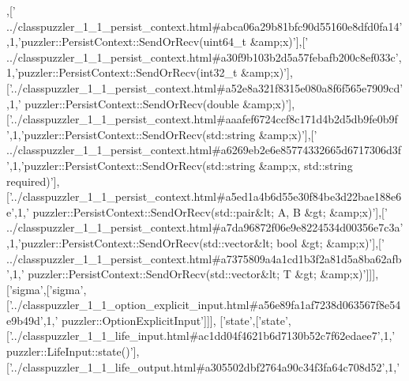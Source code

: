 \begin{DoxyCode}
  [\textcolor{stringliteral}{'sendorrecv'},[\textcolor{stringliteral}{'SendOrRecv'},[\textcolor{stringliteral}{'../classpuzzler\_1\_1\_persist\_context.html#a6dff69ce0bd12a3facf21e283148a43c'}
      ,1,\textcolor{stringliteral}{'puzzler::PersistContext::SendOrRecv(uint32\_t &amp;x)'}],[\textcolor{stringliteral}{'
      ../classpuzzler\_1\_1\_persist\_context.html#abca06a29b81bfc90d55160e8dfd0fa14'},1,\textcolor{stringliteral}{'puzzler::PersistContext::SendOrRecv(uint64\_t &amp;x)'}],[\textcolor{stringliteral}{'
      ../classpuzzler\_1\_1\_persist\_context.html#a30f9b103b2d5a57febafb200c8ef033c'},1,\textcolor{stringliteral}{'puzzler::PersistContext::SendOrRecv(int32\_t
       &amp;x)'}],[\textcolor{stringliteral}{'../classpuzzler\_1\_1\_persist\_context.html#a52e8a321f8315e080a8f6f565e7909cd'},1,\textcolor{stringliteral}{'
      puzzler::PersistContext::SendOrRecv(double &amp;x)'}],[\textcolor{stringliteral}{'../classpuzzler\_1\_1\_persist\_context.html#aaafef6724ccf8c171d4b2d5db9fe0b9f
      '},1,\textcolor{stringliteral}{'puzzler::PersistContext::SendOrRecv(std::string &amp;x)'}],[\textcolor{stringliteral}{'
      ../classpuzzler\_1\_1\_persist\_context.html#a6269eb2e6e85774332665d6717306d3f'},1,\textcolor{stringliteral}{'puzzler::PersistContext::SendOrRecv(std::string &amp;x, std::string
       required)'}],[\textcolor{stringliteral}{'../classpuzzler\_1\_1\_persist\_context.html#a5ed1a4b6d55e30f84be3d22bae188e6e'},1,\textcolor{stringliteral}{'
      puzzler::PersistContext::SendOrRecv(std::pair&lt; A, B &gt; &amp;x)'}],[\textcolor{stringliteral}{'
      ../classpuzzler\_1\_1\_persist\_context.html#a7da96872f06e9e8224534d00356e7c3a'},1,\textcolor{stringliteral}{'puzzler::PersistContext::SendOrRecv(std::vector&lt; bool &gt; &amp;x)'}],[\textcolor{stringliteral}{'
      ../classpuzzler\_1\_1\_persist\_context.html#a7375809a4a1cd1b3f2a81d5a8ba62afb'},1,\textcolor{stringliteral}{'
      puzzler::PersistContext::SendOrRecv(std::vector&lt; T &gt; &amp;x)'}]]],
  [\textcolor{stringliteral}{'sigma'},[\textcolor{stringliteral}{'sigma'},[\textcolor{stringliteral}{'../classpuzzler\_1\_1\_option\_explicit\_input.html#a56e89fa1af7238d063567f8e54e9b49d'},1,\textcolor{stringliteral}{'
      puzzler::OptionExplicitInput'}]]],
  [\textcolor{stringliteral}{'state'},[\textcolor{stringliteral}{'state'},[\textcolor{stringliteral}{'../classpuzzler\_1\_1\_life\_input.html#ac1dd04f4621b6d7130b52c7f62edaee7'},1,\textcolor{stringliteral}{'
      puzzler::LifeInput::state()'}],[\textcolor{stringliteral}{'../classpuzzler\_1\_1\_life\_output.html#a305502dbf2764a90c34f3fa64c708d52'},1,\textcolor{stringliteral}{'
}
\end{DoxyCode}
